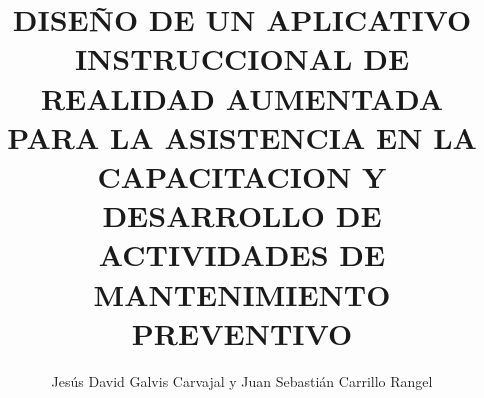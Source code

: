 \documentclass{ara}
\title{DISEÑO DE UN APLICATIVO INSTRUCCIONAL DE REALIDAD AUMENTADA PARA LA ASISTENCIA EN LA CAPACITACION Y DESARROLLO DE ACTIVIDADES DE MANTENIMIENTO PREVENTIVO}
\author{Jesús David Galvis Carvajal y Juan Sebastián Carrillo Rangel}
\begin{document}
    \coverpage
    \doublespacing
\end{document}
